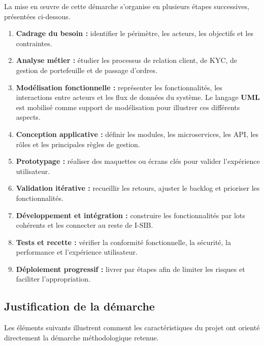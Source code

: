 \documentclass[a4paper,12pt]{report}
\begin{document}
La mise en œuvre de cette démarche s'organise en plusieurs étapes successives,
présentées ci-dessous.

\begin{enumerate}
  \item \textbf{Cadrage du besoin :} identifier le périmètre, les acteurs,
        les objectifs et les contraintes.
  \item \textbf{Analyse métier :} étudier les processus de relation client,
        de KYC, de gestion de portefeuille et de passage d'ordres.

\item \textbf{Modélisation fonctionnelle :} représenter les fonctionnalités,
      les interactions entre acteurs et les flux de données du système.
      Le langage \textbf{UML} est mobilisé comme support de modélisation
      pour illustrer ces différents aspects.

  \item \textbf{Conception applicative :} définir les modules, les
        microservices, les API, les rôles et les principales règles de gestion.
  \item \textbf{Prototypage :} réaliser des maquettes ou écrans clés pour
        valider l'expérience utilisateur.
  \item \textbf{Validation itérative :} recueillir les retours, ajuster le
        backlog et prioriser les fonctionnalités.
  \item \textbf{Développement et intégration :} construire les fonctionnalités
        par lots cohérents et les connecter au reste de I-SIB.
  \item \textbf{Tests et recette :} vérifier la conformité fonctionnelle, la
        sécurité, la performance et l'expérience utilisateur.
  \item \textbf{Déploiement progressif :} livrer par étapes afin de limiter
        les risques et faciliter l'appropriation.
\end{enumerate}

\subsection{Justification de la démarche}

Les éléments suivants illustrent comment les caractéristiques du projet ont orienté directement la démarche méthodologique retenue.
\end{document}
